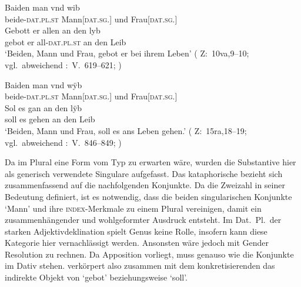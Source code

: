 \begin{exe}
\ex \label{ex:kczbeidenundesynt1}
\begin{xlist}
	\ex \label{ex:kczbeidenundesynt1_1}
		\gll Baiden man vnd wib \\
			beide-\textsc{dat.pl\subMF.st} Mann[\textsc{dat.sg.\MascM}] und
				Frau[\textsc{dat.sg.\NeutF}] \\
	\sn \gll Gebott er allen an den lyb \\
			gebot er all-\textsc{dat.pl\subMF.st} an den Leib \\
		\trans `Beiden, Mann und Frau, gebot er bei ihrem Leben'
			(%
				Z:~10va,9--10; vgl.~abweichend
				\KC:~V.~619--621;
				\cite[92]{schroeder1895}%
			)

\ex \label{ex:kczbeidenundesynt1_2}
	\gll Baiden man vnd wÿb \\
			beide-\textsc{dat.pl\subMF.st} Mann[\textsc{dat.sg.\MascM}] und
				Frau[\textsc{dat.sg.\NeutF}] \\
	\sn \gll Sol es gan an den lÿb \\
			soll es gehen an den Leib \\
		\trans `Beiden, Mann und Frau, soll es ans Leben gehen.'
			(%
				Z:~15ra,18--19; vgl.~abweichend
				\KC:~V.~846--849;
				\cite[97]{schroeder1895}%
			)
\end{xlist}
\end{exe}

Da im Plural eine Form vom Typ  zu erwarten wäre, wurden die
Substantive hier als generisch verwendete Singulare aufgefasst. Das
kataphorische  bezieht sich zusammenfassend auf die nachfolgenden
Konjunkte. Da  die Zweizahl in seiner Bedeutung definiert, ist es
notwendig, dass die beiden singularischen Konjunkte  `Mann' und
 ihre \textsc{index}-Merkmale zu einem Plural vereinigen, damit ein
zusammenhängender und wohlgeformter Ausdruck entsteht. Im Dat.~Pl.\ der starken
Adjektivdeklination spielt Genus keine Rolle, insofern kann diese Kategorie
hier vernachlässigt werden. Ansonsten wäre jedoch mit Gender Resolution zu
rechnen. Da Apposition vorliegt, muss  genauso wie die Konjunkte im
Dativ stehen.  verkörpert also zusammen mit dem konkretisierenden
 das indirekte Objekt von  `gebot'
beziehungsweise  `soll'.

